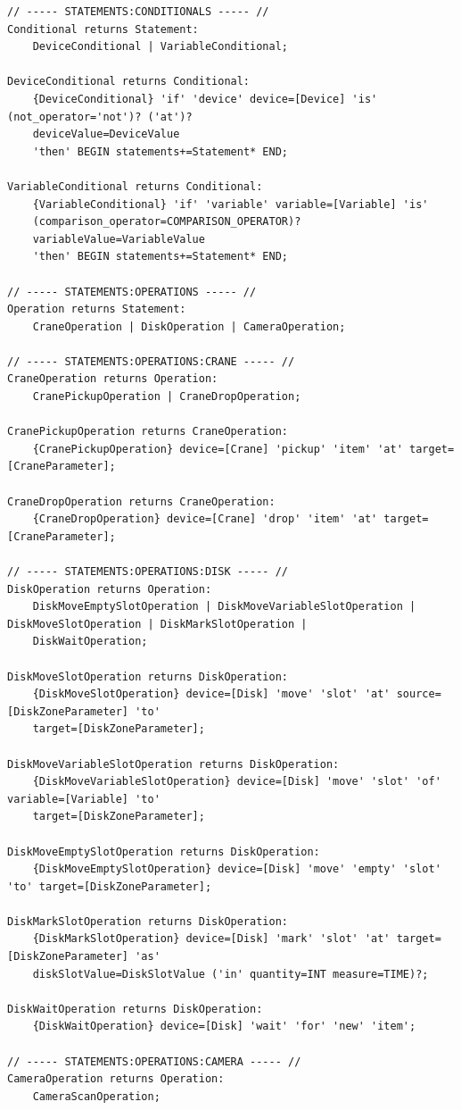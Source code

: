 \begin{verbatim}
// ----- STATEMENTS:CONDITIONALS ----- //
Conditional returns Statement:
	DeviceConditional | VariableConditional;

DeviceConditional returns Conditional:
	{DeviceConditional} 'if' 'device' device=[Device] 'is' (not_operator='not')? ('at')?
	deviceValue=DeviceValue
	'then' BEGIN statements+=Statement* END;

VariableConditional returns Conditional:
	{VariableConditional} 'if' 'variable' variable=[Variable] 'is'
	(comparison_operator=COMPARISON_OPERATOR)?
	variableValue=VariableValue
	'then' BEGIN statements+=Statement* END;

// ----- STATEMENTS:OPERATIONS ----- //
Operation returns Statement:
	CraneOperation | DiskOperation | CameraOperation;

// ----- STATEMENTS:OPERATIONS:CRANE ----- //
CraneOperation returns Operation:
	CranePickupOperation | CraneDropOperation;

CranePickupOperation returns CraneOperation:
	{CranePickupOperation} device=[Crane] 'pickup' 'item' 'at' target=[CraneParameter];

CraneDropOperation returns CraneOperation:
	{CraneDropOperation} device=[Crane] 'drop' 'item' 'at' target=[CraneParameter];

// ----- STATEMENTS:OPERATIONS:DISK ----- //
DiskOperation returns Operation:
	DiskMoveEmptySlotOperation | DiskMoveVariableSlotOperation | DiskMoveSlotOperation | DiskMarkSlotOperation |
	DiskWaitOperation;

DiskMoveSlotOperation returns DiskOperation:
	{DiskMoveSlotOperation} device=[Disk] 'move' 'slot' 'at' source=[DiskZoneParameter] 'to'
	target=[DiskZoneParameter];

DiskMoveVariableSlotOperation returns DiskOperation:
	{DiskMoveVariableSlotOperation} device=[Disk] 'move' 'slot' 'of' variable=[Variable] 'to'
	target=[DiskZoneParameter];

DiskMoveEmptySlotOperation returns DiskOperation:
	{DiskMoveEmptySlotOperation} device=[Disk] 'move' 'empty' 'slot' 'to' target=[DiskZoneParameter];

DiskMarkSlotOperation returns DiskOperation:
	{DiskMarkSlotOperation} device=[Disk] 'mark' 'slot' 'at' target=[DiskZoneParameter] 'as'
	diskSlotValue=DiskSlotValue ('in' quantity=INT measure=TIME)?;

DiskWaitOperation returns DiskOperation:
	{DiskWaitOperation} device=[Disk] 'wait' 'for' 'new' 'item';

// ----- STATEMENTS:OPERATIONS:CAMERA ----- //
CameraOperation returns Operation:
	CameraScanOperation;


\end{verbatim}

